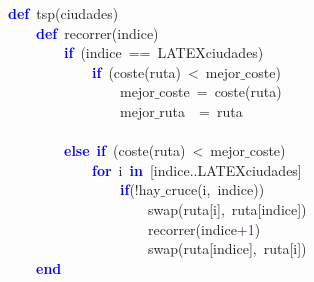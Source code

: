 \noindent
\mbox{}\textbf{\textcolor{Blue}{def}}\ tsp\textcolor{BrickRed}{(}ciudades\textcolor{BrickRed}{)} \\
\mbox{}\ \ \ \ \textbf{\textcolor{Blue}{def}}\ recorrer\textcolor{BrickRed}{(}indice\textcolor{BrickRed}{)} \\
\mbox{}\ \ \ \ \ \ \ \ \textbf{\textcolor{Blue}{if}}\ \textcolor{BrickRed}{(}indice\ \textcolor{BrickRed}{==}\ LATEXciudades\textcolor{BrickRed}{)} \\
\mbox{}\ \ \ \ \ \ \ \ \ \ \ \ \textbf{\textcolor{Blue}{if}}\ \textcolor{BrickRed}{(}coste\textcolor{BrickRed}{(}ruta\textcolor{BrickRed}{)}\ \textcolor{BrickRed}{\textless{}}\ mejor$\_$coste\textcolor{BrickRed}{)} \\
\mbox{}\ \ \ \ \ \ \ \ \ \ \ \ \ \ \ \ mejor$\_$coste\ \textcolor{BrickRed}{=}\ coste\textcolor{BrickRed}{(}ruta\textcolor{BrickRed}{)} \\
\mbox{}\ \ \ \ \ \ \ \ \ \ \ \ \ \ \ \ mejor$\_$ruta\ \ \textcolor{BrickRed}{=}\ ruta \\
\mbox{} \\
\mbox{}\ \ \ \ \ \ \ \ \textbf{\textcolor{Blue}{else}}\ \textbf{\textcolor{Blue}{if}}\ \textcolor{BrickRed}{(}coste\textcolor{BrickRed}{(}ruta\textcolor{BrickRed}{)}\ \textcolor{BrickRed}{\textless{}}\ mejor$\_$coste\textcolor{BrickRed}{)} \\
\mbox{}\ \ \ \ \ \ \ \ \ \ \ \ \textbf{\textcolor{Blue}{for}}\ i\ \textbf{\textcolor{Blue}{in}}\ \textcolor{BrickRed}{[}indice\textcolor{BrickRed}{..}LATEXciudades\textcolor{BrickRed}{]} \\
\mbox{}\ \ \ \ \ \ \ \ \ \ \ \ \ \ \ \ \textbf{\textcolor{Blue}{if}}\textcolor{BrickRed}{(!}hay$\_$cruce\textcolor{BrickRed}{(}i\textcolor{BrickRed}{,}\ indice\textcolor{BrickRed}{))} \\
\mbox{}\ \ \ \ \ \ \ \ \ \ \ \ \ \ \ \ \ \ \ \ swap\textcolor{BrickRed}{(}ruta\textcolor{BrickRed}{[}i\textcolor{BrickRed}{],}\ ruta\textcolor{BrickRed}{[}indice\textcolor{BrickRed}{])} \\
\mbox{}\ \ \ \ \ \ \ \ \ \ \ \ \ \ \ \ \ \ \ \ recorrer\textcolor{BrickRed}{(}indice\textcolor{BrickRed}{+}\textcolor{Purple}{1}\textcolor{BrickRed}{)} \\
\mbox{}\ \ \ \ \ \ \ \ \ \ \ \ \ \ \ \ \ \ \ \ swap\textcolor{BrickRed}{(}ruta\textcolor{BrickRed}{[}indice\textcolor{BrickRed}{],}\ ruta\textcolor{BrickRed}{[}i\textcolor{BrickRed}{])} \\
\mbox{}\ \ \ \ \textbf{\textcolor{Blue}{end}} \\
